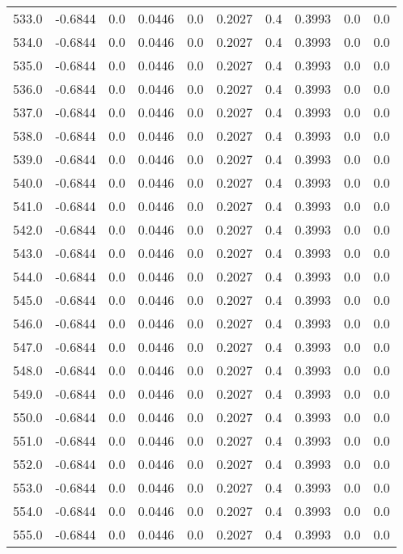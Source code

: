 \begin{longtable}{lrrrrrrrrr}
533.0 & -0.6844 & 0.0 & 0.0446 & 0.0 & 0.2027 & 0.4 & 0.3993 & 0.0 & 0.0 \\
534.0 & -0.6844 & 0.0 & 0.0446 & 0.0 & 0.2027 & 0.4 & 0.3993 & 0.0 & 0.0 \\
535.0 & -0.6844 & 0.0 & 0.0446 & 0.0 & 0.2027 & 0.4 & 0.3993 & 0.0 & 0.0 \\
536.0 & -0.6844 & 0.0 & 0.0446 & 0.0 & 0.2027 & 0.4 & 0.3993 & 0.0 & 0.0 \\
537.0 & -0.6844 & 0.0 & 0.0446 & 0.0 & 0.2027 & 0.4 & 0.3993 & 0.0 & 0.0 \\
538.0 & -0.6844 & 0.0 & 0.0446 & 0.0 & 0.2027 & 0.4 & 0.3993 & 0.0 & 0.0 \\
539.0 & -0.6844 & 0.0 & 0.0446 & 0.0 & 0.2027 & 0.4 & 0.3993 & 0.0 & 0.0 \\
540.0 & -0.6844 & 0.0 & 0.0446 & 0.0 & 0.2027 & 0.4 & 0.3993 & 0.0 & 0.0 \\
541.0 & -0.6844 & 0.0 & 0.0446 & 0.0 & 0.2027 & 0.4 & 0.3993 & 0.0 & 0.0 \\
542.0 & -0.6844 & 0.0 & 0.0446 & 0.0 & 0.2027 & 0.4 & 0.3993 & 0.0 & 0.0 \\
543.0 & -0.6844 & 0.0 & 0.0446 & 0.0 & 0.2027 & 0.4 & 0.3993 & 0.0 & 0.0 \\
544.0 & -0.6844 & 0.0 & 0.0446 & 0.0 & 0.2027 & 0.4 & 0.3993 & 0.0 & 0.0 \\
545.0 & -0.6844 & 0.0 & 0.0446 & 0.0 & 0.2027 & 0.4 & 0.3993 & 0.0 & 0.0 \\
546.0 & -0.6844 & 0.0 & 0.0446 & 0.0 & 0.2027 & 0.4 & 0.3993 & 0.0 & 0.0 \\
547.0 & -0.6844 & 0.0 & 0.0446 & 0.0 & 0.2027 & 0.4 & 0.3993 & 0.0 & 0.0 \\
548.0 & -0.6844 & 0.0 & 0.0446 & 0.0 & 0.2027 & 0.4 & 0.3993 & 0.0 & 0.0 \\
549.0 & -0.6844 & 0.0 & 0.0446 & 0.0 & 0.2027 & 0.4 & 0.3993 & 0.0 & 0.0 \\
550.0 & -0.6844 & 0.0 & 0.0446 & 0.0 & 0.2027 & 0.4 & 0.3993 & 0.0 & 0.0 \\
551.0 & -0.6844 & 0.0 & 0.0446 & 0.0 & 0.2027 & 0.4 & 0.3993 & 0.0 & 0.0 \\
552.0 & -0.6844 & 0.0 & 0.0446 & 0.0 & 0.2027 & 0.4 & 0.3993 & 0.0 & 0.0 \\
553.0 & -0.6844 & 0.0 & 0.0446 & 0.0 & 0.2027 & 0.4 & 0.3993 & 0.0 & 0.0 \\
554.0 & -0.6844 & 0.0 & 0.0446 & 0.0 & 0.2027 & 0.4 & 0.3993 & 0.0 & 0.0 \\
555.0 & -0.6844 & 0.0 & 0.0446 & 0.0 & 0.2027 & 0.4 & 0.3993 & 0.0 & 0.0 \\

\end{longtable}

